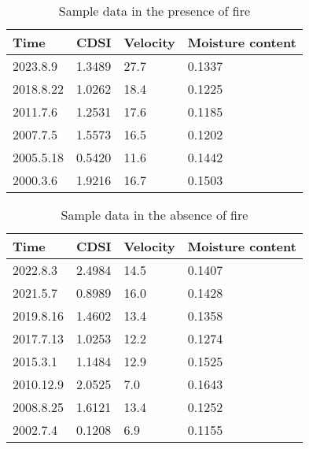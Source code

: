 \documentclass[12pt]{article}  %
\begin{document}
   \begin{table}[htbp]
 	\begin{center}
 		\caption{Sample data in the presence of fire}
 		\begin{tabular}{m{1.7cm} m{1.5cm}m{1.5cm}m{1.5cm}}
 			\toprule[2pt]
 			\multicolumn{1}{m{2cm}}{\centering Time}
 			&\multicolumn{1}{m{2cm}}{\centering CDSI }
 			&\multicolumn{1}{m{2cm}}{\centering Velocity }
 			&\multicolumn{1}{m{2cm}}{\centering Moisture content }\\
 			\midrule
 			2023.8.9& 1.3489 & 27.7 & 0.1337 \\
 			\vspace{2pt}
 			2018.8.22& 1.0262 & 18.4 & 0.1225 \\
 			\vspace{2pt}
 			2011.7.6& 1.2531 & 17.6 & 0.1185 \\
 			\vspace{2pt}
 			2007.7.5& 1.5573 & 16.5 & 0.1202 \\
 			\vspace{2pt}
 			2005.5.18& 0.5420 & 11.6 & 0.1442 \\
 			\vspace{2pt}
 			2000.3.6& 1.9216 & 16.7 & 0.1503 \\
 			
 			\bottomrule[2pt]
 		\end{tabular}
 	\end{center}
 \end{table}
 \vspace{-0.5cm}
    \begin{table}[H]
 	\begin{center}
 		\caption{Sample data in the absence of fire}
 		\begin{tabular}{m{1.5cm} m{1.5cm}m{1.5cm}m{1.5cm}}
 			\toprule[2pt]
 			\multicolumn{1}{m{2cm}}{\centering Time}
 			&\multicolumn{1}{m{2cm}}{\centering CDSI }
 			&\multicolumn{1}{m{2cm}}{\centering Velocity }
 			&\multicolumn{1}{m{2cm}}{\centering Moisture content }\\
 			\midrule
 			2022.8.3& 2.4984 & 14.5 & 0.1407 \\
 			\vspace{2pt}
 			2021.5.7& 0.8989 & 16.0 & 0.1428 \\
 			\vspace{2pt}
 			2019.8.16& 1.4602 & 13.4 & 0.1358 \\
 			\vspace{2pt}
 			2017.7.13& 1.0253 & 12.2 & 0.1274 \\
 			\vspace{2pt}
 			2015.3.1& 1.1484 & 12.9 & 0.1525 \\
 			\vspace{2pt}
 			2010.12.9& 2.0525 & 7.0 & 0.1643 \\
 			\vspace{2pt}
 			2008.8.25& 1.6121 & 13.4 & 0.1252 \\
 			\vspace{2pt}
 			2002.7.4& 0.1208 & 6.9 & 0.1155 \\
 			
 			\bottomrule[2pt]
 		\end{tabular}
 	\end{center}
 \end{table}
\end{document}
